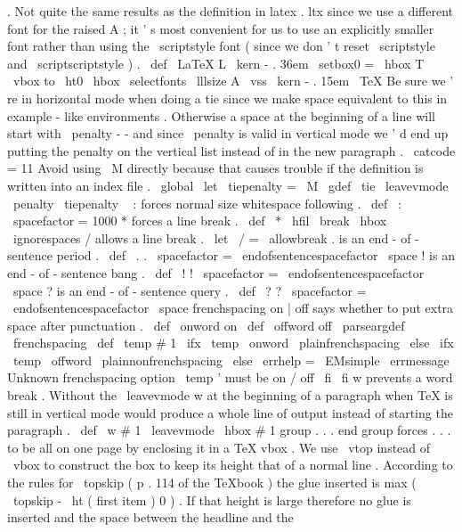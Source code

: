 .
Not
quite
the
same
results
as
the
definition
in
%
latex
.
ltx
since
we
use
a
different
font
for
the
raised
A
;
it
'
s
most
%
convenient
for
us
to
use
an
explicitly
smaller
font
rather
than
using
%
the
\
scriptstyle
font
(
since
we
don
'
t
reset
\
scriptstyle
and
%
\
scriptscriptstyle
)
.
%
\
def
\
LaTeX
{
%
L
\
kern
-
.
36em
{
\
setbox0
=
\
hbox
{
T
}
%
\
vbox
to
\
ht0
{
\
hbox
{
\
selectfonts
\
lllsize
A
}
\
vss
}
}
%
\
kern
-
.
15em
\
TeX
}
%
Be
sure
we
'
re
in
horizontal
mode
when
doing
a
tie
since
we
make
space
%
equivalent
to
this
in
example
-
like
environments
.
Otherwise
a
space
%
at
the
beginning
of
a
line
will
start
with
\
penalty
-
-
and
%
since
\
penalty
is
valid
in
vertical
mode
we
'
d
end
up
putting
the
%
penalty
on
the
vertical
list
instead
of
in
the
new
paragraph
.
{
\
catcode
=
11
%
Avoid
using
\
M
directly
because
that
causes
trouble
%
if
the
definition
is
written
into
an
index
file
.
\
global
\
let
\
tiepenalty
=
\
M
\
gdef
\
tie
{
\
leavevmode
\
penalty
\
tiepenalty
\
}
}
%
:
forces
normal
size
whitespace
following
.
\
def
\
:
{
\
spacefactor
=
1000
}
%
*
forces
a
line
break
.
\
def
\
*
{
\
hfil
\
break
\
hbox
{
}
\
ignorespaces
}
%
/
allows
a
line
break
.
\
let
\
/
=
\
allowbreak
%
.
is
an
end
-
of
-
sentence
period
.
\
def
\
.
{
.
\
spacefactor
=
\
endofsentencespacefactor
\
space
}
%
!
is
an
end
-
of
-
sentence
bang
.
\
def
\
!
{
!
\
spacefactor
=
\
endofsentencespacefactor
\
space
}
%
?
is
an
end
-
of
-
sentence
query
.
\
def
\
?
{
?
\
spacefactor
=
\
endofsentencespacefactor
\
space
}
%
frenchspacing
on
|
off
says
whether
to
put
extra
space
after
punctuation
.
%
\
def
\
onword
{
on
}
\
def
\
offword
{
off
}
%
\
parseargdef
\
frenchspacing
{
%
\
def
\
temp
{
#
1
}
%
\
ifx
\
temp
\
onword
\
plainfrenchspacing
\
else
\
ifx
\
temp
\
offword
\
plainnonfrenchspacing
\
else
\
errhelp
=
\
EMsimple
\
errmessage
{
Unknown
frenchspacing
option
\
temp
'
must
be
on
/
off
}
%
\
fi
\
fi
}
%
w
prevents
a
word
break
.
Without
the
\
leavevmode
w
at
the
%
beginning
of
a
paragraph
when
TeX
is
still
in
vertical
mode
would
%
produce
a
whole
line
of
output
instead
of
starting
the
paragraph
.
\
def
\
w
#
1
{
\
leavevmode
\
hbox
{
#
1
}
}
%
group
.
.
.
end
group
forces
.
.
.
to
be
all
on
one
page
by
enclosing
%
it
in
a
TeX
vbox
.
We
use
\
vtop
instead
of
\
vbox
to
construct
the
box
%
to
keep
its
height
that
of
a
normal
line
.
According
to
the
rules
for
%
\
topskip
(
p
.
114
of
the
TeXbook
)
the
glue
inserted
is
%
max
(
\
topskip
-
\
ht
(
first
item
)
0
)
.
If
that
height
is
large
%
therefore
no
glue
is
inserted
and
the
space
between
the
headline
and
%
the
